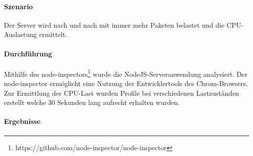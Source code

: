 \documentclass[a4paper]{spie}  %
\begin{document}
\paragraph{Szenario} 
Der Server wird nach und nach mit immer mehr Paketen belastet und die CPU-Auslastung ermittelt.


\paragraph{Durchführung}
Mithilfe des node-inspectors\footnote{https://github.com/node-inspector/node-inspector} wurde die NodeJS-Serveranwendung analysiert. Der node-inspector ermöglicht eine Nutzung der Entwicklertools des Chrom-Browsers. Zur Ermittlung der CPU-Last wurden Profile bei verschiedenen Lastzuständen erstellt welche 30 Sekunden lang aufrecht erhalten wurden.


\paragraph{Ergebnisse}

\end{document}
